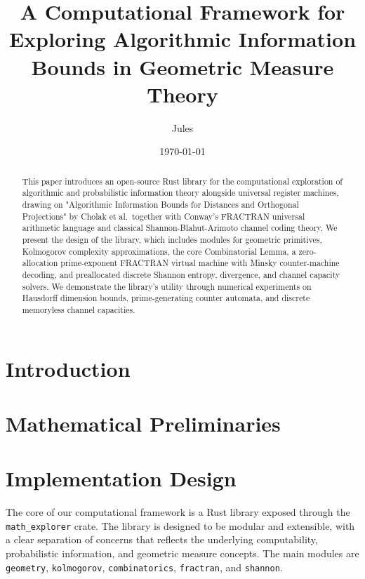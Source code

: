 \documentclass{article}
\title{A Computational Framework for Exploring Algorithmic Information Bounds in Geometric Measure Theory}
\author{Jules}
\date{\today}
\begin{document}
\maketitle

\begin{abstract}
This paper introduces an open-source Rust library for the computational exploration of algorithmic and probabilistic information theory alongside universal register machines, drawing on "Algorithmic Information Bounds for Distances and Orthogonal Projections" by Cholak et al.\ together with Conway's FRACTRAN universal arithmetic language and classical Shannon-Blahut-Arimoto channel coding theory. We present the design of the library, which includes modules for geometric primitives, Kolmogorov complexity approximations, the core Combinatorial Lemma, a zero-allocation prime-exponent FRACTRAN virtual machine with Minsky counter-machine decoding, and preallocated discrete Shannon entropy, divergence, and channel capacity solvers. We demonstrate the library's utility through numerical experiments on Hausdorff dimension bounds, prime-generating counter automata, and discrete memoryless channel capacities.
\end{abstract}

\section{Introduction}

\section{Mathematical Preliminaries}

\section{Implementation Design}

The core of our computational framework is a Rust library exposed through the \texttt{math\_explorer} crate. The library is designed to be modular and extensible, with a clear separation of concerns that reflects the underlying computability, probabilistic information, and geometric measure concepts. The main modules are \texttt{geometry}, \texttt{kolmogorov}, \texttt{combinatorics}, \texttt{fractran}, and \texttt{shannon}.
\end{document}
